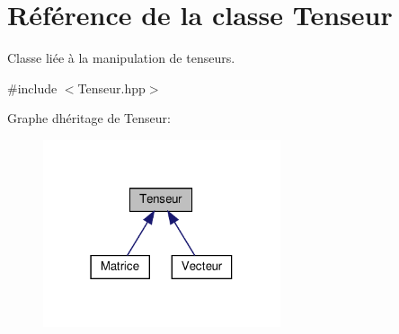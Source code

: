 \hypertarget{class_tenseur}{}\section{Référence de la classe Tenseur}
\label{class_tenseur}


Classe liée à la manipulation de tenseurs.  




{\ttfamily \#include $<$Tenseur.\+hpp$>$}



Graphe d\textquotesingle{}héritage de Tenseur\+:\nopagebreak
\begin{figure}[H]
\begin{center}
\leavevmode
\includegraphics[width=198pt]{class_tenseur__inherit__graph}
\end{center}
\end{figure}

